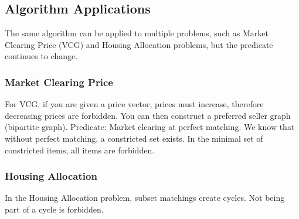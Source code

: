 \documentclass[twoside]{article}
\begin{document}
\subsection{Algorithm Applications}
The same algorithm can be applied to multiple problems, such as Market Clearing Price (VCG) and Housing Allocation problems, but the predicate continues to change. \newline
\subsubsection{Market Clearing Price}
For VCG, if you are given a price vector, prices must increase, therefore decreasing prices are forbidden. You can then construct a preferred seller graph (bipartite graph). \newline
Predicate: Market clearing at perfect matching. \newline
We know that without perfect matching, a constricted set exists. \newline
In the minimal set of constricted items, all items are forbidden. \newline
\subsubsection{Housing Allocation}
In the Housing Allocation problem, subset matchings create cycles. Not being part of a cycle is forbidden. 
\end{document}
